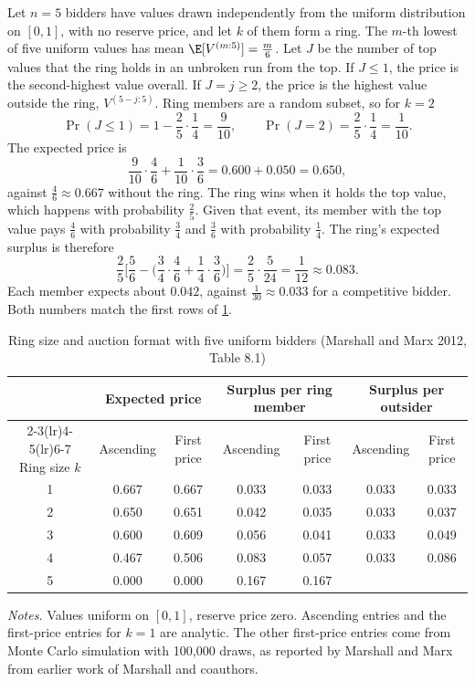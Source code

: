 \begin{example}\label{ex:15-ring-gain}
Let $n=5$ bidders have values drawn independently from the uniform distribution on $[0,1]$, with no
reserve price, and let $k$ of them form a ring. The $m$-th lowest of five uniform values has mean
$\E[V^{(m:5)}]=\frac{m}{6}$. Let $J$ be the number of top values that the ring holds in an unbroken run
from the top. If $J\le1$, the price is the second-highest value overall. If $J=j\ge2$, the price is the
highest value outside the ring, $V^{(5-j:5)}$. Ring members are a random subset, so for $k=2$
\[
\Pr(J\le1)=1-\frac{2}{5}\cdot\frac{1}{4}=\frac{9}{10},\qquad \Pr(J=2)=\frac{2}{5}\cdot\frac{1}{4}=\frac{1}{10}.
\]
The expected price is
\[
\frac{9}{10}\cdot\frac{4}{6}+\frac{1}{10}\cdot\frac{3}{6}=0.600+0.050=0.650,
\]
against $\frac{4}{6}\approx0.667$ without the ring. The ring wins when it holds the top value, which
happens with probability $\frac{2}{5}$. Given that event, its member with the top value pays $\frac{4}{6}$
with probability $\frac{3}{4}$ and $\frac{3}{6}$ with probability $\frac{1}{4}$. The ring's expected
surplus is therefore
\[
\frac{2}{5}\Big[\frac{5}{6}-\Big(\frac{3}{4}\cdot\frac{4}{6}+\frac{1}{4}\cdot\frac{3}{6}\Big)\Big]
=\frac{2}{5}\cdot\frac{5}{24}=\frac{1}{12}\approx0.083 .
\]
Each member expects about $0.042$, against $\frac{1}{30}\approx0.033$ for a competitive bidder. Both numbers
match the first rows of \cref{tab:15-mm-rings}.
\end{example}

\begin{table}[htbp]
\centering
\caption{Ring size and auction format with five uniform bidders (Marshall and Marx 2012, Table 8.1)}
\label{tab:15-mm-rings}
{\small
\setlength{\tabcolsep}{4pt}
\begin{tabular}{ccccccc}
\toprule
 & \multicolumn{2}{c}{Expected price} & \multicolumn{2}{c}{Surplus per ring member} & \multicolumn{2}{c}{Surplus per outsider}\\
\cmidrule(lr){2-3}\cmidrule(lr){4-5}\cmidrule(lr){6-7}
Ring size $k$ & Ascending & First price & Ascending & First price & Ascending & First price\\
\midrule
1 & 0.667 & 0.667 & 0.033 & 0.033 & 0.033 & 0.033\\
2 & 0.650 & 0.651 & 0.042 & 0.035 & 0.033 & 0.037\\
3 & 0.600 & 0.609 & 0.056 & 0.041 & 0.033 & 0.049\\
4 & 0.467 & 0.506 & 0.083 & 0.057 & 0.033 & 0.086\\
5 & 0.000 & 0.000 & 0.167 & 0.167 & & \\
\bottomrule
\end{tabular}}

\smallskip
\begin{minipage}{0.93\textwidth}
\footnotesize \textit{Notes.} Values uniform on $[0,1]$, reserve price zero. Ascending entries and the
first-price entries for $k=1$ are analytic. The other first-price entries come from Monte Carlo simulation
with 100,000 draws, as reported by Marshall and Marx from earlier work of Marshall and coauthors.
\end{minipage}
\end{table}

